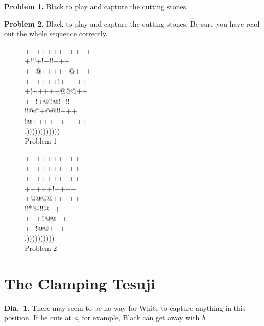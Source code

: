 \documentclass[royalvopaper,10pt,twoside,onecolumn,draft]{memoir}
\begin{document}
\noindent
\textbf{Problem 1.} Black to play and capture the cutting stones.

\noindent
\textbf{Problem 2.} Black to play and capture the cutting stones. Be sure you
have read out the whole sequence correctly.

\begin{figure}[ht]
    \begin{minipage}[c]{0.57\linewidth}
        \centering    
        {\gnos%
        ++++++++++++\\
        +!!!+!+!!+++\\
        ++@+++++@+++\\
        ++++++!+++++\\
        +!+++++@@@++\\
        ++!+@!!@!+!!\\
        !!@@+@@!!+++\\
        !@++++++++++\\
        ,))))))))))))\\
        }
        Problem 1
    \end{minipage}%
    \begin{minipage}[c]{0.43\linewidth}
        \centering    
        {\gnos%
        ++++++++++\\
        ++++++++++\\
        ++++++++++\\
        +++++!++++\\
        +@@@@+++++\\
        !!*!@!!@++\\
        +++!!@@+++\\
        ++!@@+++++\\
        ,))))))))))\\
        }
        Problem 2
    \end{minipage}
\end{figure}

\section{The Clamping Tesuji}
\textbf{Dia.\ 1.} There may seem to be no way for White to capture anything in
this position. If he cuts at \textit{a}, for example, Black can get away with \textit{b}.
\end{document}
